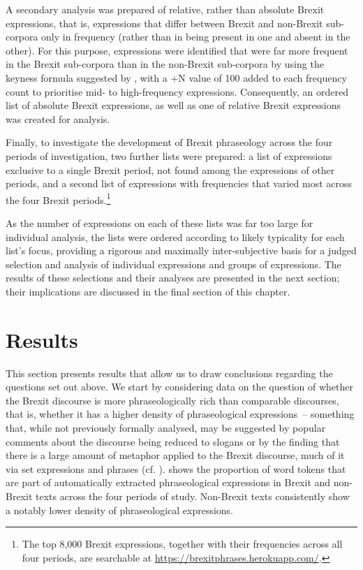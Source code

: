 \documentclass[output=paper]{langscibook}
\begin{document}
A secondary analysis was prepared of relative, rather than absolute Brexit expressions, that is, expressions that differ between Brexit and non-Brexit sub-corpora only in frequency (rather than in being present in one and absent in the other). For this purpose, expressions were identified that were far more frequent in the Brexit sub-corpora than in the non-Brexit sub-corpora by using the keyness formula suggested by \citet{Kilgarriff2009}, with a +N value of 100 added to each frequency count to prioritise mid- to high-frequency expressions. Consequently, an ordered list of absolute Brexit expressions, as well as one of relative Brexit expressions was created for analysis.

Finally, to investigate the development of Brexit phraseology across the four periods of investigation, two further lists were prepared: a list of expressions exclusive to a single Brexit period, not found among the expressions of other periods, and a second list of expressions with frequencies that varied most across the four Brexit periods.\footnote{The top 8,000 Brexit expressions, together with their frequencies across all four periods, are searchable at \url{https://brexitphrases.herokuapp.com/}.}

As the number of expressions on each of these lists was far too large for individual analysis, the lists were ordered according to likely typicality for each list’s focus, providing a rigorous and maximally inter-subjective basis for a judged selection and analysis of individual expressions and groups of expressions. The results of these selections and their analyses are presented in the next section; their implications are discussed in the final section of this chapter.

\section{Results}

This section presents results that allow us to draw conclusions regarding the questions set out above. We start by considering data on the question of whether the Brexit discourse is more phraseologically rich than comparable discourses, that is, whether it has a higher density of phraseological expressions~-- something that, while not previously formally analysed, may be suggested by popular comments about the discourse being reduced to slogans or by the finding that there is a large amount of metaphor applied to the Brexit discourse, much of it via set expressions and phrases (cf. \citealt[2]{Charteris-Black2019}).  shows the proportion of word tokens that are part of automatically extracted phraseological expressions in Brexit and non-Brexit texts across the four periods of study. Non-Brexit texts consistently show a notably lower density of phraseological expressions.
\end{document}
